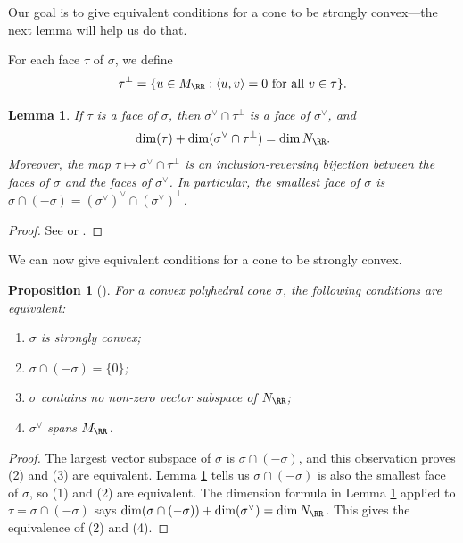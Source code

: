 \documentclass[12pt]{amsart}
\theoremstyle{plain}
\newtheorem{lemma}[theorem]{Lemma}
\newtheorem{proposition}[theorem]{Proposition}
\begin{document}
Our goal is to give equivalent conditions for a cone to be strongly convex---the next lemma will help us do that.

For each face $\tau$ of $\sigma$, we define
$$\tau^\perp = \{u \in M_\RR : \langle u, v \rangle = 0 \text{ for all } v \in \tau\}.$$

\begin{lemma}\label{lemma:dualfaces}
If $\tau$ is a face of $\sigma$, then $\sigma^\vee \cap \tau^\perp$ is a face of $\sigma^\vee$, and
$$\dim(\tau) + \dim(\sigma^\vee \cap \tau^\perp) = \dim N_\RR.$$
Moreover, the map $\tau \mapsto \sigma^\vee \cap \tau^\perp$ is an inclusion-reversing bijection between the faces of $\sigma$ and the faces of $\sigma^\vee$.
In particular, the smallest face of $\sigma$ is $\sigma \cap (-\sigma) = (\sigma^\vee)^\vee \cap (\sigma^\vee)^\perp$.
\end{lemma}
\begin{proof}
See \cite[\S 1.2]{Fulton93} or \cite[\S 1]{Zaman13}.
\end{proof}

We can now give equivalent conditions for a cone to be strongly convex.

\begin{proposition}[{\cite[\S 1.2, Proposition 3]{Fulton93}}]\label{stronglyconvexprop}
For a convex polyhedral cone $\sigma$, the following conditions are equivalent:
\begin{enumerate}
\item $\sigma$ is strongly convex;
\item $\sigma \cap (-\sigma) = \{0\}$;
\item $\sigma$ contains no non-zero vector subspace of $N_\RR$;
\item $\sigma^\vee$ spans $M_\RR$.
\end{enumerate}
\end{proposition}
\begin{proof}
The largest vector subspace of $\sigma$ is $\sigma \cap (-\sigma)$, and this observation proves (2) and (3) are equivalent.
Lemma \ref{lemma:dualfaces} tells us $\sigma \cap(-\sigma)$ is also the smallest face of $\sigma$, so (1) and (2) are equivalent.
The dimension formula in Lemma \ref{lemma:dualfaces} applied to $\tau = \sigma \cap (-\sigma)$ says $\dim(\sigma \cap (-\sigma)) + \dim(\sigma^\vee) = \dim N_\RR$.
This gives the equivalence of (2) and (4).
\end{proof}
\end{document}
